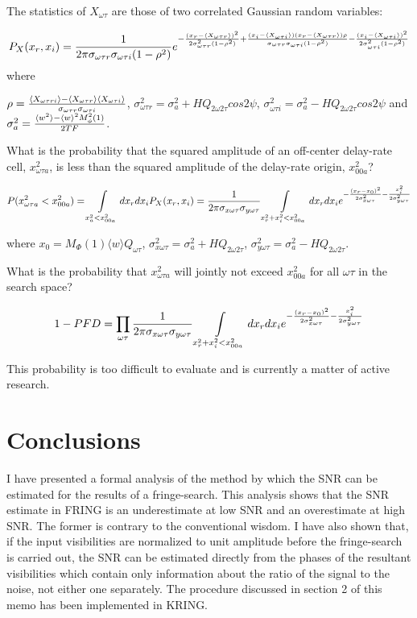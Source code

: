 The statistics of $X_{\omega\tau}$ are those of two correlated Gaussian
random variables:

$$P_X(x_r,x_i) = {1\over2\pi\sigma_{\omega\tau r}\sigma_{\omega\tau i}(1-\rho^2)}
e^{-{(x_r - \langle X_{\omega\tau r}\rangle)^2\over2\sigma_{\omega\tau r}^2(1-\rho^2)}
+{(x_i - \langle X_{\omega\tau i}\rangle)(x_r - \langle X_{\omega\tau r}\rangle)\rho\over\sigma_{\omega\tau r}\sigma_{\omega\tau i}(1-\rho^2)}
-{(x_i - \langle X_{\omega\tau i}\rangle)^2\over2\sigma_{\omega\tau i}^2(1-\rho^2)}}$$
where

$\rho = {\langle X_{\omega\tau ri}\rangle - \langle X_{\omega\tau r}\rangle\langle X_{\omega\tau i}\rangle\over\sigma_{\omega\tau r}\sigma_{\omega\tau i}}$,
$\sigma_{\omega\tau r}^2 = \sigma_a^2 +  HQ_{2\omega2\tau}cos2\psi$,
$\sigma_{\omega\tau i}^2 = \sigma_a^2 -  HQ_{2\omega2\tau}cos2\psi$
 and
$\sigma_a^2={\langle w^2\rangle -\langle w\rangle ^2M^2_\phi(1)\over2TF}$.

What is the probability that the squared amplitude of an off-center
delay-rate cell, $x_{\omega\tau a}^2$, is less than the squared
amplitude of the delay-rate origin, $x_{00a}^2$?

$$P(x_{\omega\tau a}^2 < x_{00a}^2)
  = \int\limits_{x_a^2 <  x_{00a}^2}dx_rdx_i
  P_X(x_r,x_i) =
 {1\over2\pi\sigma_{x\omega\tau}\sigma_{y\omega\tau}}
    \int\limits_{x_r^2+x_i^2 <  x_{00a}^2}dx_rdx_i
e^{-{(x_r-x_0)^2\over2\sigma_{x\omega\tau}^2}
   -{x_i^2\over2\sigma_{y\omega\tau}^2}}$$

where $x_0 = M_\Phi(1)\langle w\rangle Q_{\omega\tau}$,
$\sigma_{x\omega\tau}^2 = \sigma_a^2 +  HQ_{2\omega2\tau}$,
$\sigma_{y\omega\tau}^2 = \sigma_a^2 -  HQ_{2\omega2\tau}$.

What is the probability that $x_{\omega\tau a}^2$ will jointly not exceed
$x_{00a}^2$ for all $\omega\tau$ in the search space?

$$ 1-PFD = \prod\limits_{\omega\tau}
 {1\over2\pi\sigma_{x\omega\tau}\sigma_{y\omega\tau}}
    \int\limits_{x_r^2+x_i^2 <  x_{00a}^2}dx_rdx_i
e^{-{(x_r-x_0)^2\over2\sigma_{x\omega\tau}^2}
   -{x_i^2\over2\sigma_{y\omega\tau}^2}}$$

This probability is too difficult to evaluate and is currently a
matter of active research.

\section{Conclusions}

I have presented a formal analysis of the method by which the SNR can
be estimated for the results of a fringe-search.  This analysis shows
that the SNR estimate in FRING is an underestimate at low SNR and an
overestimate at high SNR.  The former is contrary to the conventional
wisdom.  I have also shown that, if the input visibilities are
normalized to unit amplitude before the fringe-search is carried out,
the SNR can be estimated directly from the phases of the resultant
visibilities which contain only information about the ratio of the
signal to the noise, not either one separately.  The procedure
discussed in section 2 of this memo has been implemented in KRING.

